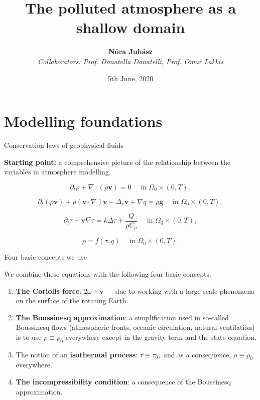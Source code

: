 \documentclass{beamer}
\title{The polluted atmosphere as a shallow domain}
\author[N\'ora Juh\'asz] { \textbf{N\'ora Juh\'asz} \\[1mm] \textit{Collaborators: Prof. Donatella Donatelli, Prof. Omar Lakkis}}
\institute{Department of Information Engineering, Computer Science and Mathematics \\ University of L'Aquila }
\date{5th June, 2020}
\begin{document}
\begin{frame}
\titlepage
\end{frame}

\section{Modelling foundations}

\begin{frame}{Conservation laws of geophysical fluids}

\textbf{Starting point:} a comprehensive picture of the relationship between the variables in atmosphere modelling.

$$ \partial_t \rho + \nabla \cdot (\rho \mathbf{v})  = 0 \quad \text{ in } \Omega_0 \times (0,T), $$

$$ \partial_t (\rho \mathbf{v}) + \rho (\mathbf{v} \cdot \nabla)\mathbf{v} -\Delta_{\nu} \mathbf{v} + \nabla q = \rho \mathbf{g} \quad \text{ in } \Omega_0 \times (0,T), $$

$$ \partial_t \tau + \mathbf{v} \nabla \tau = k \Delta \tau + \frac{Q}{\rho C_\rho} \quad \text{ in } \Omega_0 \times (0,T), $$

$$ \rho = f(\tau, q)  \quad \text{ in } \Omega_0 \times (0,T). $$

\end{frame}

\begin{frame}{Four basic concepts we use}

We combine these equations with the following four basic concepts.

\begin{enumerate}

\item \textbf{The Coriolis force}: $2 \omega \times \mathbf{v}$ --- due to working with a large-scale phenomena on the surface of the rotating Earth.
\item \textbf{The Boussinesq approximation}: a simplification used in so-called Boussinesq flows (atmospheric fronts, oceanic circulation, natural ventilation) is to use $\rho \equiv \rho_0$ everywhere except in the gravity term and the state equation.
\item The notion of an \textbf{isothermal process}: $\tau \equiv \tau_0,$ and as a consequence, $\rho \equiv \rho_0$ everywhere.
\item \textbf{The incompressibility condition}: a consequence of the Boussinesq approximation.

\end{enumerate}

\end{frame}
\end{document}

